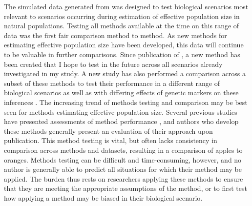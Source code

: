 The simulated data generated from  was designed to test biological scenarios most relevant to scenarios occurring during estimation of effective population size in natural populations. Testing all methods available at the time on this range of data was the first fair comparison method to method. As new methods for estimating effective population size have been developed, this data will continue to be valuable in further comparisons. Since publication of , a new method \citep{Hui:2015} has been created that I hope to test in the future across all scenarios already investigated in my study. A new study has also performed a comparison across a subset of these methods to test their performance in a different range of biological scenarios as well as with differing effects of genetic markers on these inferences \citep{Wang:2016}. The increasing trend of methods testing and comparison may be best seen for methods estimating effective population size. Several previous studies have presented assessments of method performance \citep{Barker:2011, Hoehn:2012, Holleley:2013, Neel:2013, Ryman:2013}, and authors who develop these methods generally present an evaluation of their approach upon publication. This method testing is vital, but often lacks consistency in comparison across methods and datasets, resulting in a comparison of apples to oranges. Methods testing can be difficult and time-consuming, however, and no author is generally able to predict all situations for which their method may be applied. The burden thus rests on researchers applying these methods to ensure that they are meeting the appropriate assumptions of the method, or to first test how applying a method may be biased in their biological scenario.

